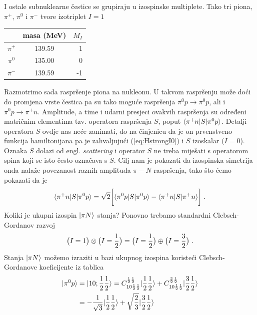 \begin{primjer}

I ostale subnuklearne čestice se grupiraju u izospinske multiplete.
Tako tri piona, $\pi^+$, $\pi^0$ i $\pi^-$ tvore izotriplet $I=1$
\begin{center}
\renewcommand{\arraystretch}{1.3}
\begin{tabular}{ccr}
  & masa (MeV) & $M_I$ \\ \hline
$\pi^+$  &  139.59  & 1 \\
$\pi^0$  &  135.00  & 0 \\
$\pi^-$  &  139.59  &-1
\end{tabular}
\renewcommand{\arraystretch}{1.0}
\end{center}
Razmotrimo sada raspršenje piona na nukleonu. U takvom raspršenju
može doći do promjena vrste čestica pa su tako moguće raspršenja
$\pi^0 p \to \pi^0 p$, ali i $\pi^0 p \to \pi^+ n$. Amplitude, a time
i udarni presjeci ovakvih raspršenja su određeni matričnim elementima
tzv. operatora raspršenja $S$, poput $\langle \pi^+ n |S| \pi^0 p  \rangle$.
Detalji operatora $S$ ovdje nas neće zanimati, do na činjenicu da je
on prvenstveno funkcija hamiltonijana pa je zahvaljujući (\ref{eq:HstrongI0})
i $S$ izoskalar ($I=0$). 
Oznaka $S$ dolazi od engl. \emph{scattering} i operator $S$ ne treba
miješati s operatorom spina koji se isto često označava s $S$.
Cilj nam je pokazati da izospinska simetrija
onda nalaže povezanost raznih amplituda $\pi - N$ raspršenja, tako
što ćemo pokazati da je
\begin{equation}
 \langle \pi^+ n |S| \pi^0 p  \rangle = \sqrt{2} \bigg[
 \langle \pi^0 p |S| \pi^0 p  \rangle -
 \langle \pi^+ n |S| \pi^+ n \rangle \bigg] \;.
 \label{eq:piNrelation}
\end{equation}
Koliki je ukupni izospin $| \pi N \rangle$ stanja? Ponovno trebamo standardni
Clebsch-Gordanov razvoj
\begin{equation}
 \big(I=1\big) \otimes  \big(I=\frac{1}{2}\big) = 
\big(I=\frac{1}{2}\big) \oplus \big(I=\frac{3}{2}\big) \;.
\end{equation}
Stanja $| \pi N \rangle$ možemo izraziti u bazi ukupnog izospina
koristeći Clebsch-Gordanove koeficijente iz tablica
\begin{align}
\ket{\pi^0 p} &= 
\ket{1 0; \fhalf \fhalf } = C^{\fhalf \fhalf}_{1 0 \fhalf \fhalf}
\ket{\fhalf \fhalf} + C^{\frac{3}{2} \fhalf}_{1 0 \fhalf \fhalf}
\ket{\frac{3}{2} \fhalf} \\
&= -\frac{1}{\sqrt{3}} \ket{\fhalf \fhalf} +\sqrt{\frac{2}{3}} \ket{\frac{3}{2} \fhalf} \\

\end{align}
\end{primjer}

